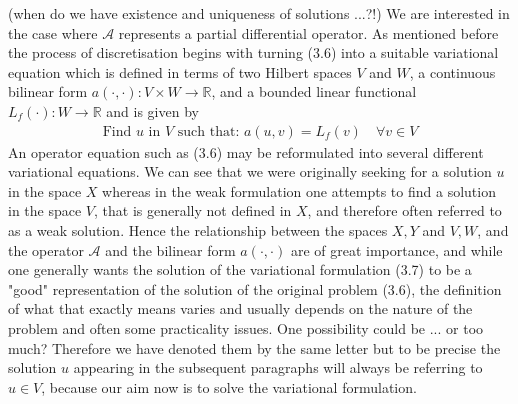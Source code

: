 \documentclass[../draft_1.tex]{subfiles}
\begin{document}
(when do we have existence and uniqueness of solutions ...?!) We are interested in the case where $\mathcal{A}$ represents a partial differential operator. As mentioned before the process of discretisation begins with turning (3.6) into a suitable variational equation which is defined in terms of two Hilbert spaces $V$ and $W$, a continuous bilinear form $a(\cdot, \cdot): V \times W \rightarrow \mathbb{R}$, and a bounded linear functional $L_f(\cdot): W \rightarrow \mathbb{R}$ and is given by
\begin{equation}
\begin{aligned}
\text{Find } u \text{ in } V \text{ such that:  } a(u, v) = L_f(v) \quad \forall v \in V
\end{aligned}
\end{equation}
An operator equation such as (3.6) may be reformulated into several different variational equations. We can see that we were originally seeking for a solution $u$ in the space $X$ whereas in the weak formulation one attempts to find a solution in the space $V$, that is generally not defined in $X$, and therefore often referred to as a weak solution. Hence the relationship between the spaces $X, Y$ and $V, W$, and the operator $\mathcal{A}$ and the bilinear form $a(\cdot, \cdot)$ are of great importance, and while one generally wants the solution of the variational formulation (3.7) to be a "good" representation of the solution of the original problem (3.6), the definition of what that exactly means varies and usually depends on the nature of the problem and often some practicality issues. One possibility could be ... or too much? Therefore we have denoted them by the same letter but to be precise the solution $u$ appearing in the subsequent paragraphs will always be referring to $u \in V$, because our aim now is to solve the variational formulation.
\end{document}
